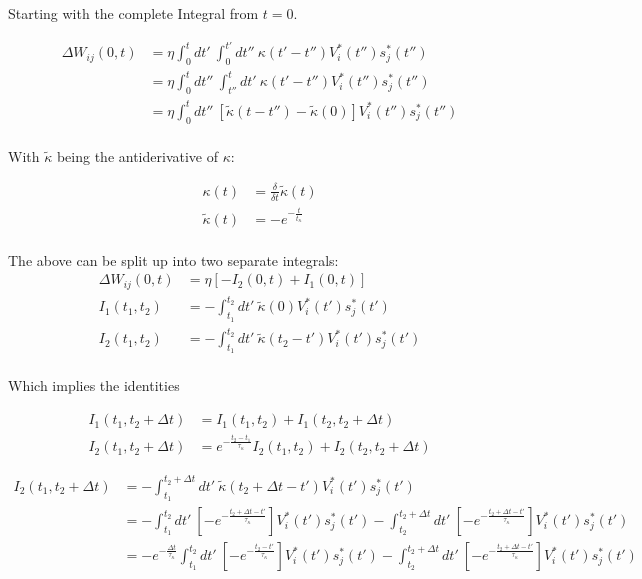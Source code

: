 Starting with the complete Integral from $t=0$.

\begin{align}
  \Delta W_{ij}(0,t) & =\eta \int_0^t dt' \  \int_0^{t'} dt'' \ \kappa(t'-t'') V_i^\ast (t'') s_j^\ast (t'')                          \\
                     & = \eta \int_0^t dt'' \  \int_{t''}^{t} dt' \ \kappa(t'-t'') V_i^\ast (t'') s_j^\ast (t'')                      \\
                     & = \eta \int_0^t dt'' \  \left[ \tilde{\kappa}(t-t'') - \tilde{\kappa}(0) \right] V_i^\ast (t'') s_j^\ast (t'') \\
\end{align}

With $\tilde{\kappa}$ being the antiderivative of $\kappa$:

\begin{align}
  \kappa(t)         & = \frac{\delta}{\delta t} \tilde{\kappa}(t) \\
  \tilde{\kappa}(t) & = - e^{-\frac{t}{t_{\kappa}}}               \\
\end{align}

The above can be split up into two separate integrals:
\begin{align}
  \Delta W_{ij}(0,t) & =\eta \left[ -I_2 (0, t) + I_1(0,t) \right]                                      \\
  I_1(t_1, t_2)      & = - \int_{t_1}^{t_2} dt' \ \tilde{\kappa} (0) V_i^\ast (t') s_j^\ast (t')        \\
  I_2(t_1, t_2)      & = - \int_{t_1}^{t_2} dt' \ \tilde{\kappa} (t_2 - t') V_i^\ast (t') s_j^\ast (t') \\
\end{align}

Which implies the identities

\begin{align}
  I_1(t_1, t_2 + \Delta t) & = I_1 (t_1, t_2) + I_1 (t_2, t_2 + \Delta t)                                       \\
  I_2(t_1, t_2 + \Delta t) & = e^{- \frac{t_2 - t_1}{\tau_{\kappa}}} I_2 (t_1, t_2) + I_2 (t_2, t_2 + \Delta t)
\end{align}


\begin{align}
  I_2 (t_1, t_2 + \Delta t) & = -\int_{t_1}^{t_2 + \Delta t} dt' \ \tilde{\kappa} (t_2 + \Delta t - t') V_i^\ast (t') s_j^\ast (t')                                        \\
                            & = -\int_{t_1}^{t_2} dt' \ \left[ -e^{- \frac{t_2 + \Delta t - t'}{\tau_\kappa}} \right] V_i^\ast (t') s_j^\ast (t')
  -\int_{t_2}^{t_2 + \Delta t} dt' \ \left[ -e^{- \frac{t_2 + \Delta t - t'}{\tau_\kappa}} \right] V_i^\ast (t') s_j^\ast (t')                                             \\
                            & = -e^{- \frac{ \Delta t}{\tau_\kappa}} \int_{t_1}^{t_2} dt' \ \left[ -e^{- \frac{t_2 - t'}{\tau_\kappa}} \right] V_i^\ast (t') s_j^\ast (t')
  -\int_{t_2}^{t_2 + \Delta t} dt' \ \left[ -e^{- \frac{t_2 + \Delta t - t'}{\tau_\kappa}} \right] V_i^\ast (t') s_j^\ast (t')
\end{align}


